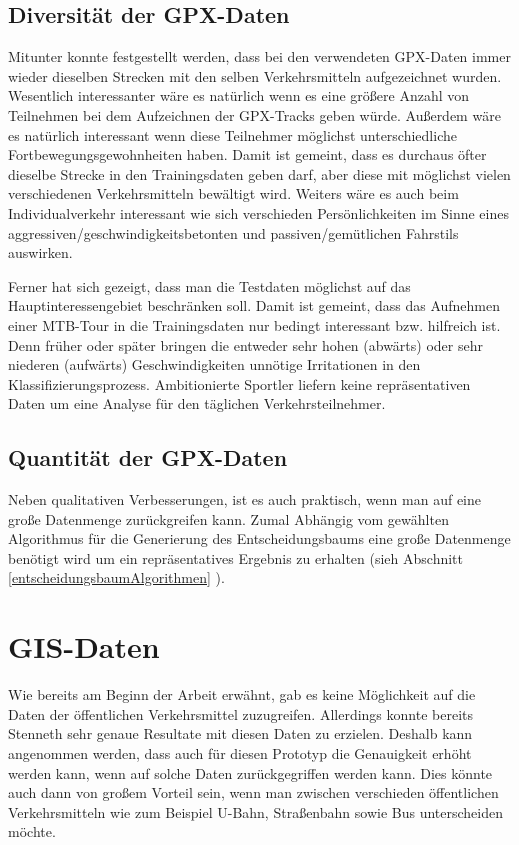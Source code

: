 \subsection{Diversität der GPX-Daten}
Mitunter konnte festgestellt werden, dass bei den verwendeten GPX-Daten immer wieder dieselben Strecken mit den selben Verkehrsmitteln aufgezeichnet wurden. Wesentlich interessanter wäre es natürlich wenn es eine größere Anzahl von Teilnehmen bei dem Aufzeichnen der GPX-Tracks geben würde. Außerdem wäre es natürlich interessant wenn diese Teilnehmer möglichst unterschiedliche Fortbewegungsgewohnheiten haben. Damit ist gemeint, dass es durchaus öfter dieselbe Strecke in den Trainingsdaten geben darf, aber diese mit möglichst vielen verschiedenen Verkehrsmitteln bewältigt wird. Weiters wäre es auch beim Individualverkehr interessant wie sich verschieden Persönlichkeiten im Sinne eines aggressiven/geschwindigkeitsbetonten und passiven/gemütlichen Fahrstils auswirken. 

Ferner hat sich gezeigt, dass man die Testdaten möglichst auf das Hauptinteressengebiet beschränken soll. Damit ist gemeint, dass das Aufnehmen einer MTB-Tour in die Trainingsdaten nur bedingt interessant bzw. hilfreich ist. Denn früher oder später bringen die entweder sehr hohen (abwärts) oder sehr niederen (aufwärts) Geschwindigkeiten unnötige Irritationen in den Klassifizierungsprozess. Ambitionierte Sportler liefern keine repräsentativen Daten um eine Analyse für den täglichen Verkehrsteilnehmer. 

\subsection{Quantität der GPX-Daten}
Neben qualitativen Verbesserungen, ist es auch praktisch, wenn man auf eine große Datenmenge zurückgreifen kann. Zumal Abhängig vom gewählten Algorithmus für die Generierung des Entscheidungsbaums eine große Datenmenge benötigt wird um ein repräsentatives Ergebnis zu erhalten (sieh Abschnitt \ref{entscheidungsbaumAlgorithmen} ).

\section{GIS-Daten}
Wie bereits am Beginn der Arbeit erwähnt, gab es keine Möglichkeit auf die Daten der öffentlichen Verkehrsmittel zuzugreifen. Allerdings konnte bereits Stenneth \cite{stenneth_transportation_2011} sehr genaue Resultate mit diesen Daten zu erzielen. Deshalb kann angenommen werden, dass auch für diesen Prototyp die Genauigkeit erhöht werden kann, wenn auf solche Daten zurückgegriffen werden kann. Dies könnte auch dann von großem Vorteil sein, wenn man zwischen verschieden öffentlichen Verkehrsmitteln wie zum Beispiel U-Bahn, Straßenbahn sowie Bus unterscheiden möchte. 

